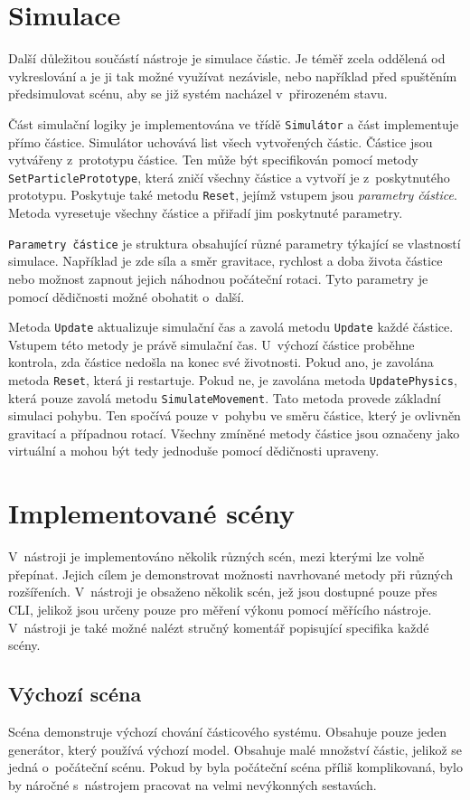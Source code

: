 \section{Simulace}
Další důležitou součástí nástroje je simulace částic. Je téměř zcela oddělená od vykreslování a je ji tak možné využívat nezávisle, nebo například před spuštěním předsimulovat scénu, aby se již systém nacházel v~přirozeném stavu. 

Část simulační logiky je implementována ve třídě \texttt{Simulátor} a část implementuje přímo částice. Simulátor uchovává list všech vytvořených částic. Částice jsou vytvářeny z~prototypu částice. Ten může být specifikován pomocí metody \texttt{SetParticlePrototype}, která zničí všechny částice a vytvoří je z~poskytnutého prototypu. Poskytuje také metodu \texttt{Reset}, jejímž vstupem jsou \emph{parametry částice}. Metoda vyresetuje všechny částice a přiřadí jim poskytnuté parametry. 

\texttt{Parametry částice} je struktura obsahující různé parametry týkající se vlastností simulace. Například je zde síla a směr gravitace, rychlost a doba života částice nebo možnost zapnout jejich náhodnou počáteční rotaci. Tyto parametry je pomocí dědičnosti možné obohatit o~další. 

Metoda \texttt{Update} aktualizuje simulační čas a zavolá metodu \texttt{Update} každé částice. Vstupem této metody je právě simulační čas. U~výchozí částice proběhne kontrola, zda částice nedošla na konec své životnosti. Pokud ano, je zavolána metoda \texttt{Reset}, která ji restartuje. Pokud ne, je zavolána metoda \texttt{UpdatePhysics}, která pouze zavolá metodu  \texttt{SimulateMovement}. Tato metoda provede základní simulaci pohybu. Ten spočívá pouze v~pohybu ve směru částice, který je ovlivněn gravitací a případnou rotací. Všechny zmíněné metody částice jsou označeny jako virtuální a mohou být tedy jednoduše pomocí dědičnosti upraveny.

\section{Implementované scény}
V~nástroji je implementováno několik různých scén, mezi kterými lze volně přepínat. Jejich cílem je demonstrovat možnosti navrhované metody při různých rozšířeních. V~nástroji je obsaženo několik scén, jež jsou dostupné pouze přes CLI, jelikož jsou určeny pouze pro měření výkonu pomocí měřícího nástroje. V~nástroji je také možné nalézt stručný komentář popisující specifika každé scény.
\subsection*{Výchozí scéna}
Scéna demonstruje výchozí chování částicového systému. Obsahuje pouze jeden generátor, který používá výchozí model. Obsahuje malé množství částic, jelikož se jedná o~počáteční scénu. Pokud by byla počáteční scéna příliš komplikovaná, bylo by náročné s~nástrojem pracovat na velmi nevýkonných sestavách. 
